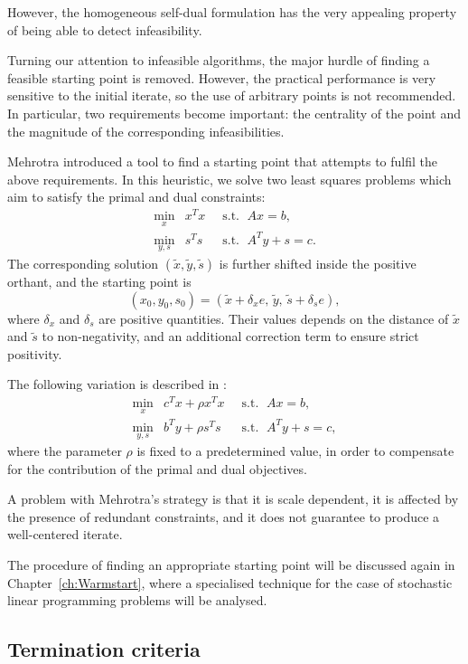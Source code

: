 However, the homogeneous self-dual formulation has the very
appealing property of being able to detect infeasibility.

Turning our attention to infeasible algorithms, the major hurdle
of finding a feasible starting point is removed. 
However, the practical performance is very sensitive to the initial
iterate, so the use of arbitrary points is not recommended.
In particular, two requirements become important: the centrality 
of the point and the magnitude of the corresponding infeasibilities.

Mehrotra \cite{Mehrotra92} introduced a tool to find a starting point 
that attempts to fulfil the above requirements. In this
heuristic, we solve two least squares problems which aim to
satisfy the primal and dual constraints:
\begin{eqnarray*}
  \min_x    \!\! & x^Tx & \;\;\mbox{s.t. }\; Ax = b,      \\
  \min_{y,s}\!\! & s^Ts & \;\;\mbox{s.t. }\; A^Ty + s = c.
\end{eqnarray*}
The corresponding solution $(\tilde x, \tilde y, \tilde s)$ is further 
shifted inside the positive orthant, and the starting point is
\[
(x_0,y_0,s_0) = (\tilde x + \delta_x e,\, \tilde y,\, \tilde s + \delta_s e),
\]
where $\delta_x$ and $\delta_s$ are positive quantities. 
Their values depends on the distance of $\tilde x$ and $\tilde s$
to non-negativity, and an additional correction term to ensure
strict positivity.

The following variation is described in \cite{GondzioTerlaky}:
\begin{eqnarray*} 
  \min_x    \!\! & c^Tx + \rho x^Tx & \;\;\mbox{s.t. }\; Ax = b,      \\
  \min_{y,s}\!\! & b^Ty + \rho s^Ts & \;\;\mbox{s.t. }\; A^Ty + s = c,
\end{eqnarray*}
where the parameter $\rho$ is fixed to a predetermined value, in order
to compensate for the contribution of the primal and dual objectives.

A problem with Mehrotra's strategy is that it is scale dependent,
it is affected by the presence of redundant constraints,
and it does not guarantee to produce a well-centered iterate.

The procedure of finding an appropriate starting point will be discussed
again in Chapter~\ref{ch:Warmstart}, where a specialised technique for
the case of stochastic linear programming problems will be analysed.

%
%
\subsection{Termination criteria}

